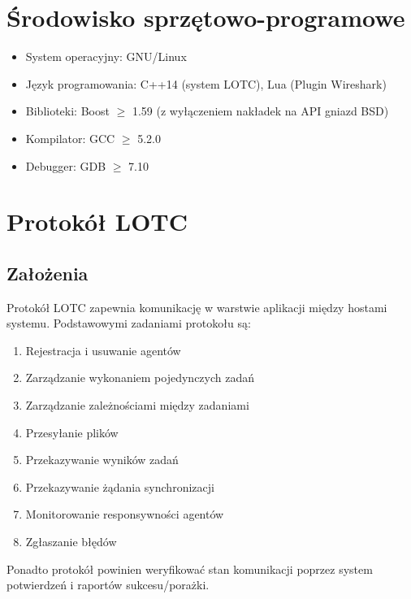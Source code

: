 \documentclass[10pt,a4paper]{article}
\begin{document}
		    \begin{figure}[H]
				\def\svgwidth{\columnwidth}
				
			\end{figure}
				
	\section{Środowisko sprzętowo-programowe}
	
	    \begin{itemize}   
			\item System operacyjny: GNU/Linux
			\item Język programowania: C++14 (system LOTC), Lua (Plugin Wireshark)
		    \item Biblioteki: Boost $ \geqslant $ 1.59 (z wyłączeniem nakładek na API gniazd BSD)
			\item Kompilator: GCC $ \geqslant $ 5.2.0
			\item Debugger: GDB $ \geqslant $ 7.10
	    \end{itemize}
	    
    \section{Protokół LOTC}
        \subsection{Założenia}
	        Protokół LOTC zapewnia komunikację w warstwie aplikacji między hostami systemu. Podstawowymi zadaniami protokołu są:
	        
	        \begin{enumerate}
				\item Rejestracja i usuwanie agentów
				\item Zarządzanie wykonaniem pojedynczych zadań
				\item Zarządzanie zależnościami między zadaniami
			    \item Przesyłanie plików
				\item Przekazywanie wyników zadań
				\item Przekazywanie żądania synchronizacji
				\item Monitorowanie responsywności agentów
				\item Zgłaszanie błędów
		    \end{enumerate}
		    
		    Ponadto protokół powinien weryfikować stan komunikacji poprzez system potwierdzeń i raportów sukcesu/porażki.
		    
\end{document}
